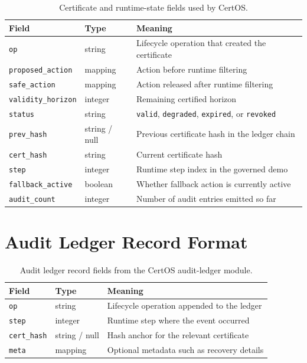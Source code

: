 \begin{table}[ht]
\centering
\caption{Certificate and runtime-state fields used by CertOS.}
\label{tab:certos-certificate-schema}
\begin{tabular}{p{3.0cm}p{1.8cm}p{5.8cm}}
\toprule
\textbf{Field} & \textbf{Type} & \textbf{Meaning} \\
\midrule
\texttt{op} & string & Lifecycle operation that created the certificate \\
\texttt{proposed\_action} & mapping & Action before runtime filtering \\
\texttt{safe\_action} & mapping & Action released after runtime filtering \\
\texttt{validity\_horizon} & integer & Remaining certified horizon \\
\texttt{status} & string & \texttt{valid}, \texttt{degraded}, \texttt{expired}, or \texttt{revoked} \\
\texttt{prev\_hash} & string / null & Previous certificate hash in the ledger chain \\
\texttt{cert\_hash} & string & Current certificate hash \\
\texttt{step} & integer & Runtime step index in the governed demo \\
\texttt{fallback\_active} & boolean & Whether fallback action is currently active \\
\texttt{audit\_count} & integer & Number of audit entries emitted so far \\
\bottomrule
\end{tabular}
\end{table}

\section{Audit Ledger Record Format}

\begin{table}[ht]
\centering
\caption{Audit ledger record fields from the CertOS audit-ledger module.}
\label{tab:certos-audit-ledger-schema}
\begin{tabular}{p{2.6cm}p{1.7cm}p{6.1cm}}
\toprule
\textbf{Field} & \textbf{Type} & \textbf{Meaning} \\
\midrule
\texttt{op} & string & Lifecycle operation appended to the ledger \\
\texttt{step} & integer & Runtime step where the event occurred \\
\texttt{cert\_hash} & string / null & Hash anchor for the relevant certificate \\
\texttt{meta} & mapping & Optional metadata such as recovery details \\
\bottomrule
\end{tabular}
\end{table}

